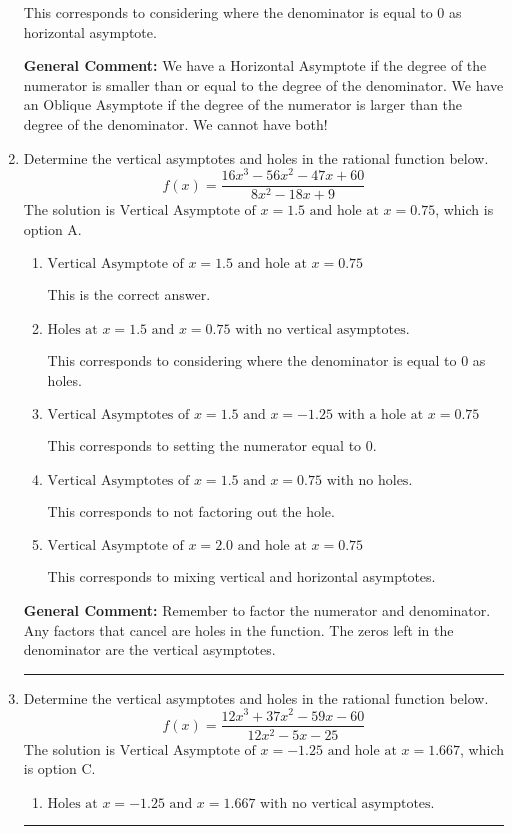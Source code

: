 \documentclass{extbook}[14pt]
\newcommand{\litem}[1]{\item #1

\rule{\textwidth}{0.4pt}}
\begin{document}
\begin{enumerate}
{\begin{enumerate}[label=\Alph*.]
This corresponds to considering where the denominator is equal to 0 as horizontal asymptote.
\end{enumerate}

\textbf{General Comment:} We have a Horizontal Asymptote if the degree of the numerator is smaller than or equal to the degree of the denominator. We have an Oblique Asymptote if the degree of the numerator is larger than the degree of the denominator. We cannot have both!
}
\litem{
Determine the vertical asymptotes and holes in the rational function below.
\[ f(x) = \frac{16x^{3} -56 x^{2} -47 x + 60}{8x^{2} -18 x + 9} \]The solution is \( \text{Vertical Asymptote of } x = 1.5 \text{ and hole at } x = 0.75 \), which is option A.\begin{enumerate}[label=\Alph*.]
\item \( \text{Vertical Asymptote of } x = 1.5 \text{ and hole at } x = 0.75 \)

This is the correct answer.
\item \( \text{Holes at } x = 1.5 \text{ and } x = 0.75 \text{ with no vertical asymptotes.} \)

This corresponds to considering where the denominator is equal to 0 as holes.
\item \( \text{Vertical Asymptotes of } x = 1.5 \text{ and } x = -1.25 \text{ with a hole at } x = 0.75 \)

This corresponds to setting the numerator equal to 0.
\item \( \text{Vertical Asymptotes of } x = 1.5 \text{ and } x = 0.75 \text{ with no holes.} \)

This corresponds to not factoring out the hole.
\item \( \text{Vertical Asymptote of } x = 2.0 \text{ and hole at } x = 0.75 \)

This corresponds to mixing vertical and horizontal asymptotes.
\end{enumerate}

\textbf{General Comment:} Remember to factor the numerator and denominator. Any factors that cancel are holes in the function. The zeros left in the denominator are the vertical asymptotes.
}
\litem{
Determine the vertical asymptotes and holes in the rational function below.
\[ f(x) = \frac{12x^{3} +37 x^{2} -59 x -60}{12x^{2} -5 x -25} \]The solution is \( \text{Vertical Asymptote of } x = -1.25 \text{ and hole at } x = 1.667 \), which is option C.\begin{enumerate}[label=\Alph*.]
\item \( \text{Holes at } x = -1.25 \text{ and } x = 1.667 \text{ with no vertical asymptotes.} \)


\end{enumerate}}
\end{enumerate}
\end{document}
